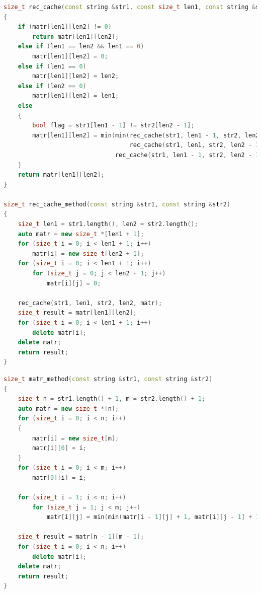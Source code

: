 \documentclass[12pt]{report}
\begin{document}
\begin{lstlisting}[label=some-code,caption=Функция нахождения расстояние Левенштейна рекурсивно с меморизацией,language=C++]
size_t rec_cache(const string &str1, const size_t len1, const string &str2, const size_t len2, size_t **matr)
{
    if (matr[len1][len2] != 0)
        return matr[len1][len2];
    else if (len1 == len2 && len1 == 0)
        matr[len1][len2] = 0;
    else if (len1 == 0)
        matr[len1][len2] = len2;
    else if (len2 == 0)
        matr[len1][len2] = len1;
    else
    {
        bool flag = str1[len1 - 1] != str2[len2 - 1];
        matr[len1][len2] = min(min(rec_cache(str1, len1 - 1, str2, len2, matr) + 1,
                                   rec_cache(str1, len1, str2, len2 - 1, matr) + 1),
                               rec_cache(str1, len1 - 1, str2, len2 - 1, matr) + flag);
    }
    return matr[len1][len2];
}

size_t rec_cache_method(const string &str1, const string &str2)
{
    size_t len1 = str1.length(), len2 = str2.length();
    auto matr = new size_t *[len1 + 1];
    for (size_t i = 0; i < len1 + 1; i++)
        matr[i] = new size_t[len2 + 1];
    for (size_t i = 0; i < len1 + 1; i++)
        for (size_t j = 0; j < len2 + 1; j++)
            matr[i][j] = 0;

    rec_cache(str1, len1, str2, len2, matr);
    size_t result = matr[len1][len2];
    for (size_t i = 0; i < len1 + 1; i++)
        delete matr[i];
    delete matr;
    return result;
}
\end{lstlisting}

\begin{lstlisting}[label=some-code,caption=Функция нахождения расстояния Левенштейна итеративно,language=C++]
size_t matr_method(const string &str1, const string &str2)
{
    size_t n = str1.length() + 1, m = str2.length() + 1;
    auto matr = new size_t *[n];
    for (size_t i = 0; i < n; i++) 
    {
        matr[i] = new size_t[m];
        matr[i][0] = i;
    }
    for (size_t i = 0; i < m; i++)
        matr[0][i] = i;

    for (size_t i = 1; i < n; i++)
        for (size_t j = 1; j < m; j++)
            matr[i][j] = min(min(matr[i - 1][j] + 1, matr[i][j - 1] + 1), matr[i - 1][j - 1] + (str1[i - 1] == str2[j - 1] ? 0 : 1));

    size_t result = matr[n - 1][m - 1];
    for (size_t i = 0; i < n; i++)
        delete matr[i];
    delete matr;
    return result;
}
\end{lstlisting}
\end{document}
